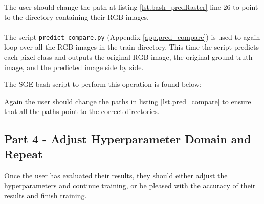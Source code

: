 

The user should change the path at listing \ref{lst.bash_predRaster} line 26 to point to the directory containing their RGB images.
\paragraph{}
The script \texttt{predict\_compare.py} (Appendix \ref{app.pred_compare}) is used to again loop over all the RGB images in the train directory. This time the script predicts each pixel class and outputs the original RGB image, the original ground truth image, and the predicted image side by side. 
\par
The SGE bash script to perform this operation is found below:

Again the user should change the paths in listing \ref{lst.pred_compare} to ensure that all the paths point to the correct directories. 
\subsection*{Part 4 - Adjust Hyperparameter Domain and Repeat}
Once the user has evaluated their results, they should either adjust the hyperparameters and continue training, or be pleased with the accuracy of their results and finish training. 
